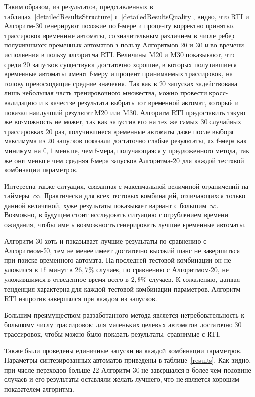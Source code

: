 \documentclass[times,specification,annotation]{itmo-student-thesis}
\begin{document}
Таким образом, из результатов, представленных в таблицах~\ref{detailedResultsStructure} и~\ref{detailedResultsQuality}, видно, что RTI и Алгоритм-30 генерируют похожие по f-мере и 
проценту корректно принятых 
трассировок временные автоматы, со значительным различием в числе ребер получившихся временных автоматов в пользу Алгоритмов-20 и 30 и во времени исполнения в пользу алгоритма RTI. 
Величины M20 и M30 показывают, что среди $20$ запусков существуют достаточно
хорошие, в которых получившиеся временные автоматы имеют f-меру и процент принимаемых трассировок, на голову превосходящие средние значения. Так как в $20$ запусках задействована лишь
небольшая часть тренировочного множества, можно провести кросс-валидацию и в качестве результата выбрать тот временной автомат, который и показал наилучший результат M20 или M30. 
Алгоритм RTI предоставить такую же
возможность не может, так как запустив его на тех же самых $30$ случайных трассировках $20$ раз, получившиеся временные автоматы даже после выбора максимума из $20$ запусков показали достаточно
слабые результаты, их f-мера как минимум на $0,1$ меньше, чем f-мера, получающаяся у предложенного метода, так же они меньше чем средняя f-мера запусков Алгоритма-20 для каждой тестовой комбинации
параметров.

Интересна также ситуация, связанная с максимальной величиной ограничений на таймеры~$\infty$. Практически для всех тестовых комбинаций, отличающихся только данной величиной, хуже результаты показывает
вариант с большим~$\infty$. Возможно, в будущем стоит исследовать ситуацию с огрублением времени ожидания, чтобы иметь возможность генерировать лучшие временные автоматы. 

Алгоритм-30 хоть и показывает лучшие результаты по сравнению с Алгоритмом-20, тем не менее имеет достаточно высокий шанс не завершиться при поиске временного автомата. На последней тестовой
комбинации он не уложился в $15$ минут в $26,7\%$ случаев, по сравнению с Алгоритмом-20, не уложившимся в отведенное время всего в $2,9\%$ случаев. К сожалению, данная тенденция характерна
для каждой тестовой комбинации параметров. Алгоритм RTI напротив завершался при каждом из запусков.

Большим преимуществом разработанного метода является нетребовательность к большому числу трассировок: для маленьких целевых автоматов достаточно $30$ трассировок, 
чтобы можно было показать результаты, сравнимые с RTI.

Также были проведены единичные запуски на каждой комбинации параметров. Параметры синтезированных автоматов приведены в таблице~\ref{results}.
Как видно, при числе переходов больше $22$ Алгоритм-30 не завершался в более чем половине случаев и его результаты оставляли желать лучшего, что не является хорошим показателем алгоритма.
\end{document}
